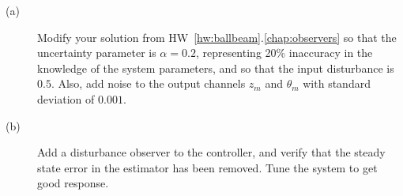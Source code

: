 \begin{description}
\item[(a)] Modify your solution from HW~\ref{hw:ballbeam}.\ref{chap:observers} so
that the uncertainty parameter is $\alpha=0.2$, representing 20\% inaccuracy in the knowledge of the system parameters, and so that the input disturbance is $0.5$. Also, add noise to the output channels $z_m$ and $\theta_m$ with standard deviation of $0.001$.  
\item[(b)] Add a disturbance observer to the controller, and verify that the steady state error in the estimator has been removed.  Tune the system to get good response.
\end{description}
